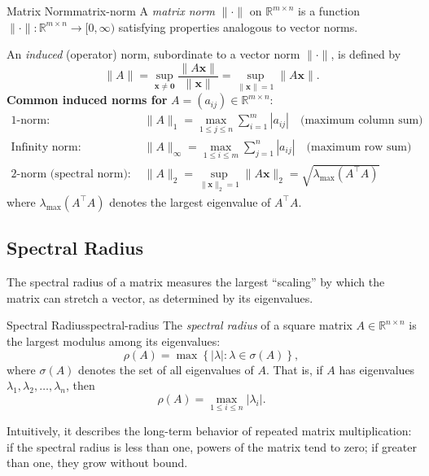 \begin{definition}{Matrix Norm}{matrix-norm}
    A \emph{matrix norm} \(\lVert \cdot \rVert\) on \(\mathbb{R}^{m \times n}\) is a function \(\lVert \cdot \rVert : \mathbb{R}^{m \times n} \to [0, \infty)\) satisfying properties analogous to vector norms.

    \medskip
    \noindent
    An \emph{induced} (operator) norm, subordinate to a vector norm \(\lVert \cdot \rVert\), is defined by
    \[
        \lVert A \rVert = \sup_{\mathbf{x} \neq \mathbf{0}} \frac{\lVert A\mathbf{x} \rVert}{\lVert \mathbf{x} \rVert} = \sup_{\lVert \mathbf{x} \rVert = 1} \lVert A\mathbf{x} \rVert.
    \]
    \medskip
    \noindent
    \textbf{Common induced norms for} \(A = (a_{ij}) \in \mathbb{R}^{m \times n}\):
    \begin{align*}
        \text{1-norm:} \qquad                 & \lVert A \rVert_1 = \max_{1 \leq j \leq n} \sum_{i=1}^m |a_{ij}| \quad \text{(maximum column sum)}                      \\[0.5em]
        \text{Infinity norm:} \qquad          & \lVert A \rVert_\infty = \max_{1 \leq i \leq m} \sum_{j=1}^n |a_{ij}| \quad \text{(maximum row sum)}                    \\[0.5em]
        \text{2-norm (spectral norm):} \qquad & \lVert A \rVert_2 = \sup_{\lVert \mathbf{x} \rVert_2 = 1} \lVert A\mathbf{x} \rVert_2 = \sqrt{\lambda_{\max}(A^\top A)}
    \end{align*}
    where \(\lambda_{\max}(A^\top A)\) denotes the largest eigenvalue of \(A^\top A\).
\end{definition}

\subsection{Spectral Radius}
The spectral radius of a matrix measures the largest \enquote{scaling} by which the matrix can stretch a vector, as determined by its eigenvalues.

\begin{definition}{Spectral Radius}{spectral-radius}
    The \emph{spectral radius} of a square matrix \(A \in \mathbb{R}^{n \times n}\) is the largest modulus among its eigenvalues:
    \[
        \rho(A) = \max \left\{ |\lambda| : \lambda \in \sigma(A) \right\},
    \]
    where \(\sigma(A)\) denotes the set of all eigenvalues of \(A\). That is, if \(A\) has eigenvalues \(\lambda_1, \lambda_2, \dots, \lambda_n\), then
    \[
        \rho(A) = \max_{1 \leq i \leq n} |\lambda_i|.
    \]
\end{definition}
Intuitively, it describes the long-term behavior of repeated matrix multiplication: if the spectral radius is less than one, powers of the matrix tend to zero; if greater than one, they grow without bound.
